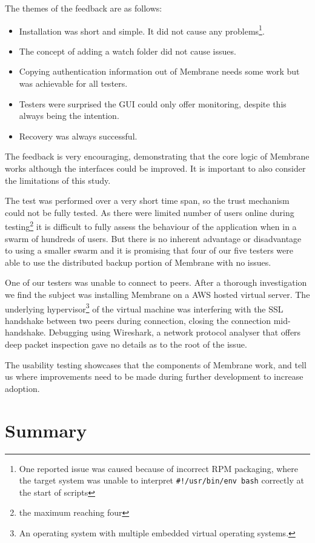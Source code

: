\documentclass[11pt, a4paper, twoside]{report}
\def\code#1{\texttt{#1}}
\begin{document}
The themes of the feedback are as follows:

\begin{itemize}
 \item Installation was short and simple. It did not cause any problems\footnote{One reported issue was caused because of incorrect RPM packaging, where the target system was unable to interpret \code{\#!/usr/bin/env bash} correctly at the start of scripts}.
 \item The concept of adding a watch folder did not cause issues.
 \item Copying authentication information out of Membrane needs some work but was achievable for all testers.
 \item Testers were surprised the GUI could only offer monitoring, despite this always being the intention.
 \item Recovery was always successful.
\end{itemize}

The feedback is very encouraging, demonstrating that the core logic of Membrane works although the interfaces could be improved. It is important to also consider the limitations of this study. 

The test was performed over a very short time span, so the trust mechanism could not be fully tested. As there were limited number of users online during testing\footnote{the maximum reaching four} it is difficult to fully assess the behaviour of the application when in a swarm of hundreds of users. But there is no inherent advantage or disadvantage to using a smaller swarm and it is promising that four of our five testers were able to use the distributed backup portion of Membrane with no issues.

One of our testers was unable to connect to peers. After a thorough investigation we find the subject was installing Membrane on a AWS hosted virtual server. The underlying hypervisor\footnote{An operating system with multiple embedded virtual operating systems.} of the virtual machine was interfering with the SSL handshake between two peers during connection, closing the connection mid-handshake. Debugging using Wireshark, a network protocol analyser that offers deep packet inspection gave no details as to the root of the issue.

The usability testing showcases that the components of Membrane work, and tell us where improvements need to be made during further development to increase adoption.

\section{Summary}
\end{document}
